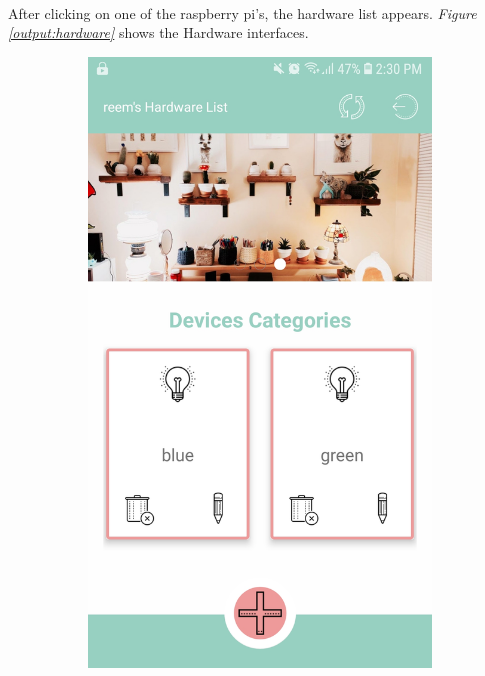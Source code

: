 \documentclass[12pt, oneside, a4paper]{book}
\begin{document}
		\paragraph{} After clicking on one of the raspberry pi's, the hardware list appears. \textit{Figure \ref{output:hardware}} shows the Hardware interfaces. 
		\begin{figure}[H]
			\centering
			\begin{subfigure}[b]{.35\linewidth}
				\includegraphics[width=\linewidth]{img/output_hardware_list.jpg}

\end{subfigure}
\end{figure}
\end{document}
